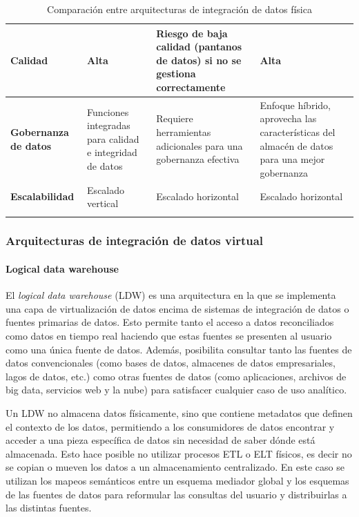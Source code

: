 \begin{longtable}{|p{3cm}|p{4cm}|p{4cm}|p{4cm}|}
    \textbf{Calidad}          & Alta                                                        & Riesgo de baja calidad (pantanos de datos) si no se gestiona correctamente   & Alta                                                                         \\ \hline
    \textbf{Gobernanza de datos} & Funciones integradas para calidad e integridad de datos   & Requiere herramientas adicionales para una gobernanza efectiva              & Enfoque híbrido, aprovecha las características del almacén de datos para una mejor gobernanza \\ \hline
    \textbf{Escalabilidad}    & Escalado vertical                                           & Escalado horizontal                                                          & Escalado horizontal                                                          \\ \hline
    \caption{Comparación entre arquitecturas de integración de datos física}\label{tab:di-physical-architectures}
\end{longtable}



\subsubsection{Arquitecturas de integración de datos virtual}


\paragraph{Logical data warehouse\newline}


El \textit{logical data warehouse} (LDW)
es una arquitectura en la que se implementa una capa de virtualización de datos
encima de sistemas de integración de datos o fuentes primarias de datos. Esto
permite tanto el acceso a datos reconciliados como datos en tiempo real haciendo que
estas fuentes se presenten al usuario como una única fuente de datos. Además, posibilita 
consultar tanto las fuentes de datos convencionales (como bases de datos, almacenes de datos empresariales, lagos de datos, etc.) 
como otras fuentes de datos (como aplicaciones, archivos de big data, servicios web y la nube) para satisfacer cualquier caso de uso analítico.

Un LDW no almacena datos físicamente, sino que contiene metadatos que definen el contexto de los datos, permitiendo a los consumidores de datos encontrar y acceder a una pieza específica de datos sin necesidad de saber dónde está almacenada.
Esto hace posible no utilizar procesos ETL o ELT físicos, es decir no se copian o mueven los datos a un almacenamiento
centralizado. En este caso se utilizan los mapeos semánticos entre un esquema mediador global y los esquemas de las fuentes
de datos para reformular las consultas del usuario y distribuirlas a las distintas fuentes.

